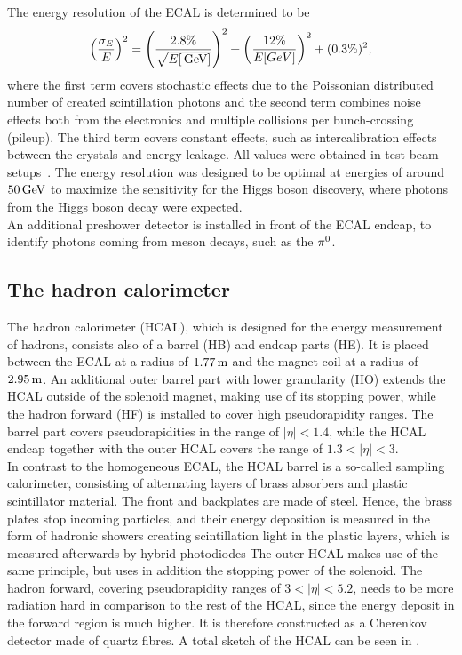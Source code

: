 The energy resolution of the ECAL is determined to be
\begin{equation}
 \left(\frac{\sigma_E}{E}\right)^2=\left(\frac{2.8\%}{\sqrt{E[\,\text{Ge\hspace{-.08em}V}]}}\right)^2 + \left(\frac{12\%}{E[GeV]}\right)^2 + (0.3\%)^2,
\end{equation}
where the first term covers stochastic effects due to the Poissonian distributed number of created scintillation photons and the second term combines noise effects both from the electronics and multiple collisions per bunch-crossing (pileup). The third term covers constant effects, such as intercalibration effects between the crystals and energy leakage. All values were obtained in test beam setups~\cite{ECALRes}. The energy resolution was designed to be optimal at energies of around $50\,\text{Ge\hspace{-.08em}V}$ to maximize the sensitivity for the Higgs boson discovery, where photons from the Higgs boson decay were expected.\\
An additional preshower detector is installed in front of the ECAL endcap, to identify photons coming from meson decays, such as the $\pi^0$.

\subsection{The hadron calorimeter}
The hadron calorimeter (HCAL), which is designed for the energy measurement of hadrons, consists also of a barrel (HB) and endcap parts (HE). It is placed between the ECAL at a radius of $1.77\,\text{m}$ and the magnet coil at a radius of $2.95\,\text{m}$. An additional outer barrel part with lower granularity (HO) extends the HCAL outside of the solenoid magnet, making use of its stopping power, while the hadron forward (HF) is installed to cover high pseudorapidity ranges. The barrel part covers pseudorapidities in the range of $|\eta|<1.4$, while the HCAL endcap together with the outer HCAL covers the range of $1.3<|\eta|<3$.\\
In contrast to the homogeneous ECAL, the HCAL barrel is a so-called sampling calorimeter, consisting of alternating layers of brass absorbers and plastic scintillator material. The front and backplates are made of steel. Hence, the brass plates stop incoming particles, and their energy deposition is measured in the form of hadronic showers creating scintillation light in the plastic layers, which is measured afterwards by hybrid photodiodes The outer HCAL makes use of the same principle, but uses in addition the stopping power of the solenoid. The hadron forward, covering pseudorapidity ranges of $3<|\eta|<5.2$, needs to be more radiation hard in comparison to the rest of the HCAL, since the energy deposit in the forward region is much higher. It is therefore constructed as a Cherenkov detector made of quartz fibres. A total sketch of the HCAL can be seen in .

